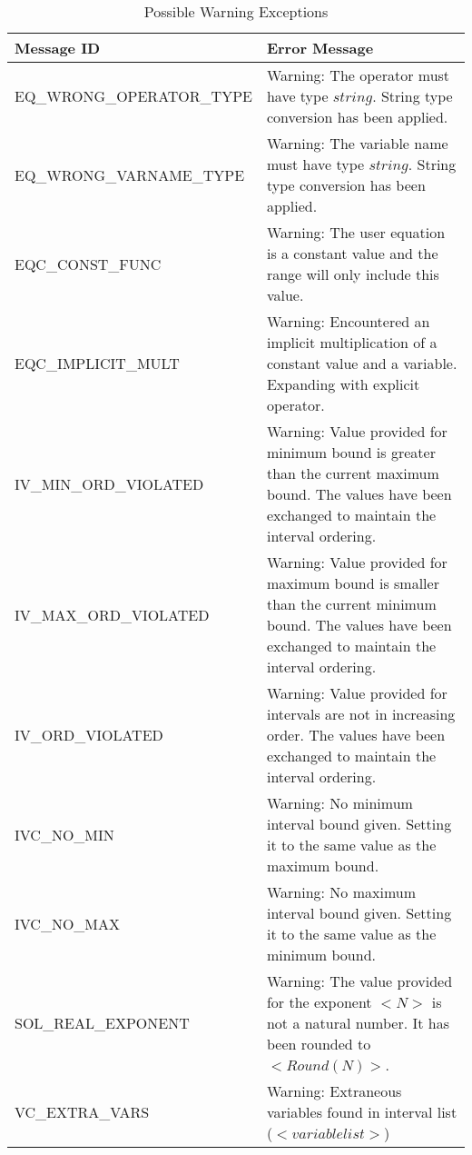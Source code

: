 \documentclass[12pt, titlepage]{article}
\begin{document}
\begin{longtable}{l p{9.5cm}}
	\caption{Possible Warning Exceptions} \\
	\toprule
	\textbf{Message ID} & \textbf{Error Message} \\
	\midrule
	EQ\_WRONG\_OPERATOR\_TYPE & Warning: The operator must have type $string$. 
	String type conversion has been applied.\\
	EQ\_WRONG\_VARNAME\_TYPE & Warning: The variable name must have type 
	$string$. String type conversion has been applied. \\
	EQC\_CONST\_FUNC & Warning: The user equation is a constant value and the 
	range will only include this value.\\
	EQC\_IMPLICIT\_MULT & Warning: Encountered an implicit multiplication of a 
	constant value and a variable. Expanding with explicit operator. \\
	IV\_MIN\_ORD\_VIOLATED & Warning: Value provided for minimum bound is 
	greater than the current maximum bound. The values have been exchanged to 
	maintain the interval ordering. \\
	IV\_MAX\_ORD\_VIOLATED & Warning: Value provided for maximum bound is 
	smaller than the current minimum bound. The values have been exchanged to 
	maintain the interval ordering. \\
	IV\_ORD\_VIOLATED & Warning: Value provided for intervals are not in 
	increasing order. The values have been exchanged to maintain the interval 
	ordering. \\
	IVC\_NO\_MIN & Warning: No minimum interval bound given. Setting it to the 
	same value as the maximum bound. \\
	IVC\_NO\_MAX & Warning: No maximum interval bound given. Setting it to the 
	same value as the minimum bound. \\
	SOL\_REAL\_EXPONENT & Warning: The value provided for the exponent $<N>$ is 
	not a natural number. It has been rounded to $<Round(N)>$. \\
	VC\_EXTRA\_VARS & Warning: Extraneous variables found in interval list 
	($<variable list>$) \\
	\bottomrule
\end{longtable}
\end{document}
